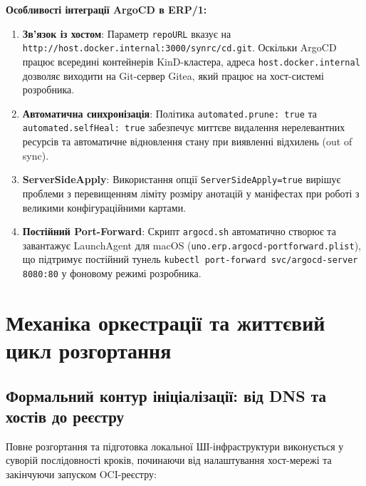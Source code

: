 \documentclass[12pt,a4paper]{article}
\begin{document}
\textbf{Особливості інтеграції ArgoCD в ERP/1:}
\begin{enumerate}
    \item \textbf{Зв'язок із хостом}: Параметр \texttt{repoURL} вказує на \texttt{http://host.docker.internal:3000/synrc/cd.git}. Оскільки ArgoCD працює всередині контейнерів KinD-кластера, адреса \texttt{host.docker.internal} дозволяє виходити на Git-сервер Gitea, який працює на хост-системі розробника.
    \item \textbf{Автоматична синхронізація}: Політика \texttt{automated.prune: true} та \texttt{automated.selfHeal: true} забезпечує миттєве видалення нерелевантних ресурсів та автоматичне відновлення стану при виявленні відхилень (out of sync).
    \item \textbf{ServerSideApply}: Використання опції \texttt{ServerSideApply=true} вирішує проблеми з перевищенням ліміту розміру анотацій у маніфестах при роботі з великими конфігураційними картами.
    \item \textbf{Постійний Port-Forward}: Скрипт \texttt{argocd.sh} автоматично створює та завантажує LaunchAgent для macOS (\texttt{uno.erp.argocd-portforward.plist}), що підтримує постійний тунель \texttt{kubectl port-forward svc/argocd-server 8080:80} у фоновому режимі розробника.
\end{enumerate}


\newpage
\section{Механіка оркестрації та життєвий цикл розгортання}

\subsection{Формальний контур ініціалізації: від DNS та хостів до реєстру}

Повне розгортання та підготовка локальної ШІ-інфраструктури виконується у суворій послідовності кроків, починаючи від налаштування хост-мережі та закінчуючи запуском OCI-реєстру:
\end{document}
